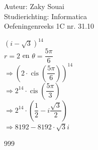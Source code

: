 \documentclass[a4paper]{article}
\begin{document}
  
\noindent \large Auteur: Zaky Souai \\
\noindent \large Studierichting: Informatica\\
\noindent \large Oefeningenreeks 1C nr. 31.10\\

\medskip

\normalsize

$(i - \sqrt{3})^{14}$ \\

$r = 2$ en $\theta = \dfrac{5\pi}{6}$ \\

$ \Rightarrow \left(2 \cdot \operatorname{cis} \left(\dfrac{5\pi}{6}\right)\right)^{14}$ \\

$ \Rightarrow 2^{14} \cdot \operatorname{cis} \left(\dfrac{5\pi}{3}\right)$ \\

$ \Rightarrow 2^{14} \cdot \left(\dfrac{1}{2} - i\dfrac{\sqrt{3}}{2}\right)$ \\

$ \Rightarrow 8192 -8192\cdot\sqrt{3}i$


\begin{thebibliography}{999}
\end{thebibliography}
\end{document}
